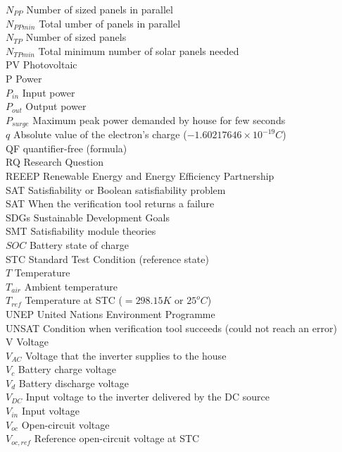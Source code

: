 $N_{PP}$ Number of sized panels in parallel \\
$N_{PPmin}$ Total umber of panels in parallel \\
$ N_{TP} $ Number of sized panels \\
$N_{TPmin}$ Total minimum number of solar panels needed \\
PV Photovoltaic \\
P Power \\
$P_{in}$ Input power \\
$P_{out}$ Output power \\
$P_{surge}$ Maximum peak power demanded by house for few seconds \\
$q$ Absolute value of the electron's charge ($ -1.60217646\times10^{-19}C $) \\
QF  quantifier-free (formula) \\
RQ Research Question \\
REEEP Renewable Energy and Energy Efficiency Partnership \\
SAT Satisfiability or Boolean satisfiability problem \\
SAT When the verification tool returns a failure \\
SDGs Sustainable Development Goals \\
SMT Satisfiability module theories \\
$ SOC $ Battery state of charge \\
STC Standard Test Condition (reference state) \\
$T$ Temperature \\
$ T_{air} $ Ambient temperature \\
$ T_{ref}$ Temperature at STC ($=298.15 K$ or $25^{o}C$) \\
UNEP United Nations Environment Programme \\
UNSAT Condition when verification tool succeeds (could not reach an error) \\
V Voltage \\
$ V_{AC}  $ Voltage that the inverter supplies to the house \\
$V_{c}$ Battery charge voltage  \\
$V_{d}$ Battery discharge voltage \\
$ V_{DC} $ Input voltage to the inverter delivered by the DC source \\
$ V_{in} $ Input voltage \\
$ V_{oc} $ Open-circuit voltage \\
$ V_{oc,ref} $ Reference open-circuit voltage at STC \\
